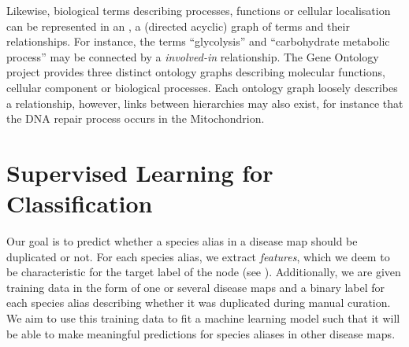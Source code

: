 \documentclass[
	fontsize=10pt, %
	twoside=false, %
	secnumdepth=1, %
  toc=indentunnumbered %
]{kaobook}
\begin{document}
Likewise, biological terms describing processes, functions or cellular
localisation can be represented in an , a (directed acyclic) graph
of terms and their relationships. For instance, the terms ``glycolysis'' and
``carbohydrate metabolic process'' may be connected by a \textit{involved-in}
relationship. The Gene Ontology project \cite{ashburner_GeneOntologyTool_2000}
provides three distinct ontology graphs describing molecular functions, cellular
component or biological processes. Each ontology graph loosely describes a
relationship, however, links between hierarchies may also exist, for instance
that the DNA repair process occurs in the Mitochondrion.




\section{Supervised Learning for Classification}
\label{sec:supervised-learning}
Our goal is to predict whether a species alias in a disease map
should be duplicated or not. For each species alias, we extract 
\textit{features}, which we deem to be characteristic for the target label of
the node (see ).
Additionally, we are given training
data in the form of one or several disease maps and a binary label for each
species alias describing whether it was duplicated during manual curation. We
aim to use this training data to fit a machine learning model such that it will
be able to make meaningful predictions for species aliases in other disease
maps.
\end{document}
